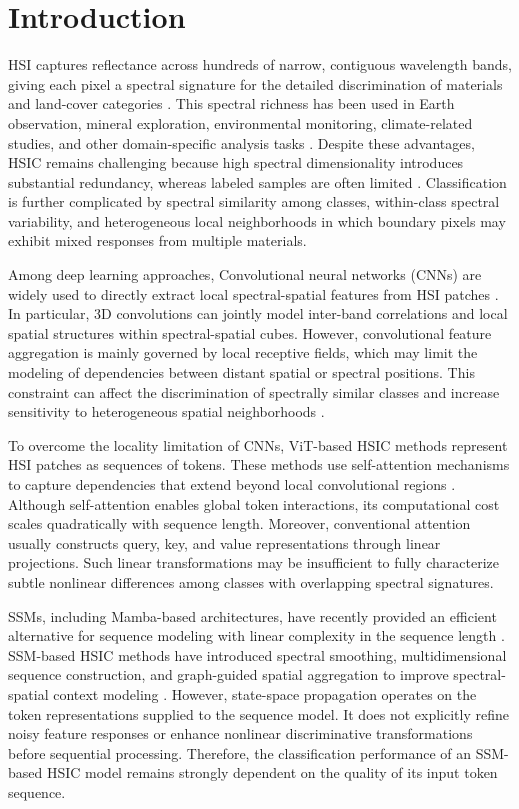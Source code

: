 \documentclass{revision_assets/ieeeaccess_revision}
\begin{document}
\section{Introduction}
\label{intro}
HSI captures reflectance across hundreds of narrow, contiguous wavelength bands, giving each pixel a spectral signature for the detailed discrimination of materials and land-cover categories \cite{ref1}. This spectral richness has been used in Earth observation, mineral exploration, environmental monitoring, climate-related studies, and other domain-specific analysis tasks \cite{ref2,ref4,ref5,ref6,ref7,ref8,ref9,ref_itt}. Despite these advantages, HSIC remains challenging because high spectral dimensionality introduces substantial redundancy, whereas labeled samples are often limited \cite{ref_act}. Classification is further complicated by spectral similarity among classes, within-class spectral variability, and heterogeneous local neighborhoods in which boundary pixels may exhibit mixed responses from multiple materials.

Among deep learning approaches, Convolutional neural networks (CNNs) are widely used to directly extract local spectral-spatial features from HSI patches \cite{ref10,ref11,ref12,ref13,ref14}. In particular, 3D convolutions can jointly model inter-band correlations and local spatial structures within spectral-spatial cubes. However, convolutional feature aggregation is mainly governed by local receptive fields, which may limit the modeling of dependencies between distant spatial or spectral positions. This constraint can affect the discrimination of spectrally similar classes and increase sensitivity to heterogeneous spatial neighborhoods \cite{ref15,ref16}.

To overcome the locality limitation of CNNs, ViT-based HSIC methods represent HSI patches as sequences of tokens. These methods use self-attention mechanisms to capture dependencies that extend beyond local convolutional regions \cite{ref17,ref18,ref19}. Although self-attention enables global token interactions, its computational cost scales quadratically with sequence length. Moreover, conventional attention usually constructs query, key, and value representations through linear projections. Such linear transformations may be insufficient to fully characterize subtle nonlinear differences among classes with overlapping spectral signatures.

SSMs, including Mamba-based architectures, have recently provided an efficient alternative for sequence modeling with linear complexity in the sequence length \cite{ref20,ref21}. SSM-based HSIC methods have introduced spectral smoothing, multidimensional sequence construction, and graph-guided spatial aggregation to improve spectral-spatial context modeling \cite{ref22,ref23,ref_dima}. However, state-space propagation operates on the token representations supplied to the sequence model. It does not explicitly refine noisy feature responses or enhance nonlinear discriminative transformations before sequential processing. Therefore, the classification performance of an SSM-based HSIC model remains strongly dependent on the quality of its input token sequence.
\end{document}
